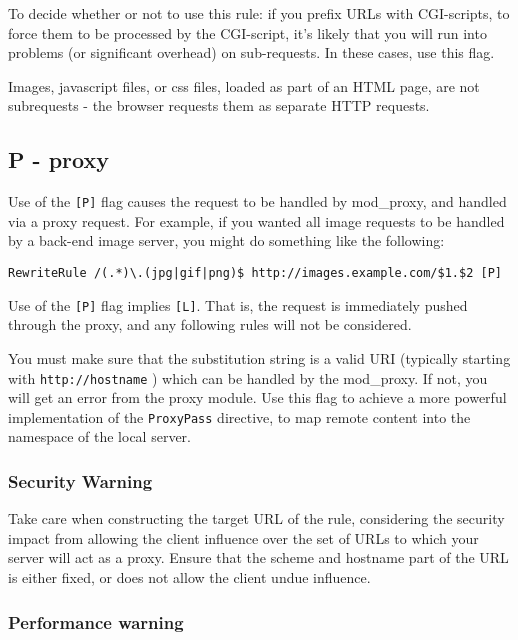 To decide whether or not to use this rule: if you prefix URLs with CGI-scripts, to force them to be processed by the CGI-script, it's likely that you will run into problems (or significant overhead) on sub-requests. In these cases, use this flag.

Images, javascript files, or css files, loaded as part of an HTML page, are not subrequests - the browser requests them as separate HTTP requests.

\subsection{P - proxy}
\label{pflag}

Use of the \verb~[P]~ flag causes the request to be handled by mod\_proxy, and handled via a proxy request. For example, if you wanted all image requests to be handled by a back-end image server, you might do something like the following:

\begin{verbatim}
RewriteRule /(.*)\.(jpg|gif|png)$ http://images.example.com/$1.$2 [P]
\end{verbatim}

Use of the \verb~[P]~ flag implies \verb~[L]~. That is, the request is immediately pushed through the proxy, and any following rules will not be considered.

You must make sure that the substitution string is a valid URI (typically starting with \verb~http://hostname~ ) which can be handled by the mod\_proxy. If not, you will get an error from the proxy module. Use this flag to achieve a more powerful implementation of the \verb~ProxyPass~ directive, to map remote content into the namespace of the local server.

\subsubsection{Security Warning}

Take care when constructing the target URL of the rule, considering the security impact from allowing the client influence over the set of URLs to which your server will act as a proxy. Ensure that the scheme and hostname part of the URL is either fixed, or does not allow the client undue influence.

\subsubsection{Performance warning}

